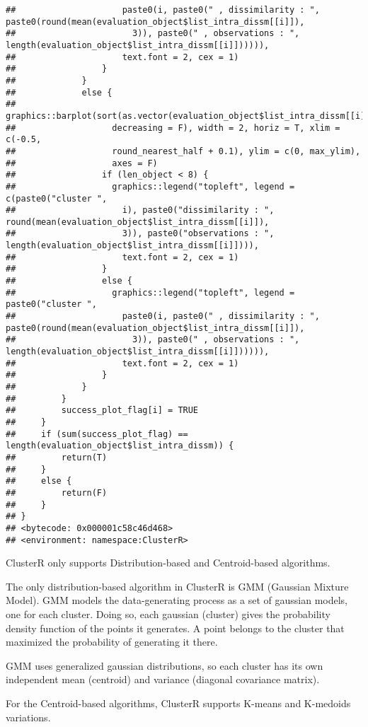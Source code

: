 \documentclass[
]{article}
\begin{document}
\begin{verbatim}
##                     paste0(i, paste0(" , dissimilarity : ", paste0(round(mean(evaluation_object$list_intra_dissm[[i]]), 
##                       3)), paste0(" , observations : ", length(evaluation_object$list_intra_dissm[[i]]))))), 
##                     text.font = 2, cex = 1)
##                 }
##             }
##             else {
##                 graphics::barplot(sort(as.vector(evaluation_object$list_intra_dissm[[i]]), 
##                   decreasing = F), width = 2, horiz = T, xlim = c(-0.5, 
##                   round_nearest_half + 0.1), ylim = c(0, max_ylim), 
##                   axes = F)
##                 if (len_object < 8) {
##                   graphics::legend("topleft", legend = c(paste0("cluster ", 
##                     i), paste0("dissimilarity : ", round(mean(evaluation_object$list_intra_dissm[[i]]), 
##                     3)), paste0("observations : ", length(evaluation_object$list_intra_dissm[[i]]))), 
##                     text.font = 2, cex = 1)
##                 }
##                 else {
##                   graphics::legend("topleft", legend = paste0("cluster ", 
##                     paste0(i, paste0(" , dissimilarity : ", paste0(round(mean(evaluation_object$list_intra_dissm[[i]]), 
##                       3)), paste0(" , observations : ", length(evaluation_object$list_intra_dissm[[i]]))))), 
##                     text.font = 2, cex = 1)
##                 }
##             }
##         }
##         success_plot_flag[i] = TRUE
##     }
##     if (sum(success_plot_flag) == length(evaluation_object$list_intra_dissm)) {
##         return(T)
##     }
##     else {
##         return(F)
##     }
## }
## <bytecode: 0x000001c58c46d468>
## <environment: namespace:ClusterR>
\end{verbatim}

ClusterR only supports Distribution-based and Centroid-based algorithms.

The only distribution-based algorithm in ClusterR is GMM (Gaussian
Mixture Model). GMM models the data-generating process as a set of
gaussian models, one for each cluster. Doing so, each gaussian (cluster)
gives the probability density function of the points it generates. A
point belongs to the cluster that maximized the probability of
generating it there.

GMM uses generalized gaussian distributions, so each cluster has its own
independent mean (centroid) and variance (diagonal covariance matrix).

For the Centroid-based algorithms, ClusterR supports K-means and
K-medoids variations.
\end{document}

